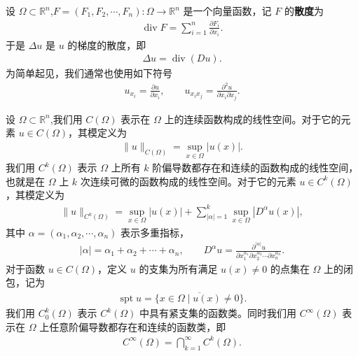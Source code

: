 \documentclass[../../main.tex]{subfiles}%
\begin{document}
\begin{definition}
设 $\Omega\subset \mathbb{R}^n$,$F=(F_1,F_2,\cdots,F_n):\Omega\to\mathbb{R}^n$ 是一个向量函数，记 $F$ 的\textbf{散度}为
\begin{align*}
\operatorname{div} F = \sum_{i=1}^n \frac{\partial F_i}{\partial x_i}.
\end{align*}
于是 $\Delta u$ 是 $u$ 的梯度的散度，即
\begin{align*}
\Delta u = \operatorname{div}(Du).
\end{align*}
为简单起见，我们通常也使用如下符号
\begin{align*}
u_{x_i} = \frac{\partial u}{\partial x_i}, \qquad u_{x_i x_j} = \frac{\partial^2 u}{\partial x_i\partial x_j}.
\end{align*}
\end{definition}

\begin{definition}\label{definition:PDE前置定义}
设 $\Omega\subset \mathbb{R}^n$,我们用 $C(\Omega)$ 表示在 $\Omega$ 上的连续函数构成的线性空间。对于它的元素 $u\in C(\Omega)$，其模定义为
\begin{align*}
\|u\|_{C(\Omega)} = \sup_{x\in\Omega} |u(x)|.
\end{align*}
我们用 $C^k(\Omega)$ 表示 $\Omega$ 上所有 $k$ 阶偏导数都存在和连续的函数构成的线性空间，也就是在 $\Omega$ 上 $k$ 次连续可微的函数构成的线性空间。对于它的元素 $u\in C^k(\Omega)$，其模定义为
\begin{align*}
\|u\|_{C^k(\Omega)} = \sup_{x\in\Omega} |u(x)| + \sum_{|\alpha|=1}^k \sup_{x\in\Omega} |D^\alpha u(x)|,
\end{align*}
其中 $\alpha=(\alpha_1,\alpha_2,\cdots,\alpha_n)$ 表示多重指标，
\begin{align}\label{eq:sfiuhsu-11}
|\alpha| = \alpha_1+\alpha_2+\cdots+\alpha_n, \qquad D^\alpha u = \frac{\partial^{|\alpha|} u}{\partial x_1^{\alpha_1}\partial x_2^{\alpha_2}\cdots\partial x_n^{\alpha_n}}.
\end{align}
对于函数 $u\in C(\Omega)$，定义 $u$ 的支集为所有满足 $u(x)\neq 0$ 的点集在 $\Omega$ 上的闭包，记为
\begin{align*}
\operatorname{spt} u = \overline{\{x\in\Omega \mid u(x)\neq 0\}}.
\end{align*}
我们用 $C_0^k(\Omega)$ 表示 $C^k(\Omega)$ 中具有紧支集的函数类。同时我们用 $C^\infty(\Omega)$ 表示在 $\Omega$ 上任意阶偏导数都存在和连续的函数类，即
\begin{align*}
C^\infty(\Omega) = \bigcap_{k=1}^\infty C^k(\Omega).
\end{align*}
\end{definition}
\end{document}
